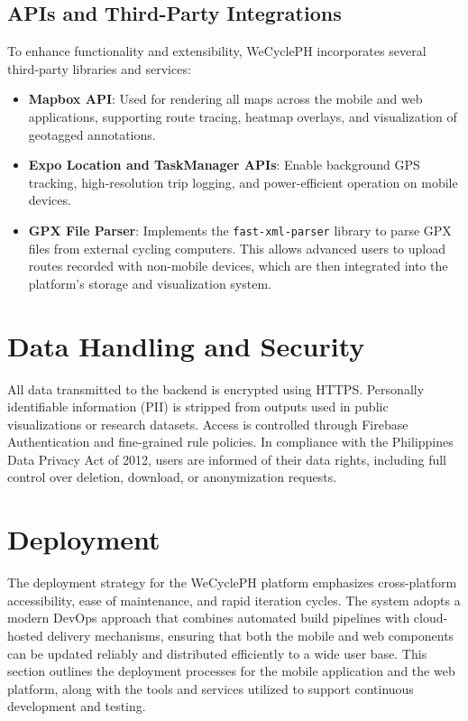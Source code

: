 \subsection{APIs and Third-Party Integrations}
To enhance functionality and extensibility, WeCyclePH incorporates several third-party libraries and services:
\begin{itemize}
\item \textbf{Mapbox API}: Used for rendering all maps across the mobile and web applications, supporting route tracing, heatmap overlays, and visualization of geotagged annotations.
\item \textbf{Expo Location and TaskManager APIs}: Enable background GPS tracking, high-resolution trip logging, and power-efficient operation on mobile devices.
\item \textbf{GPX File Parser}: Implements the \texttt{fast-xml-parser} library to parse GPX files from external cycling computers. This allows advanced users to upload routes recorded with non-mobile devices, which are then integrated into the platform's storage and visualization system.
\end{itemize}



\section{Data Handling and Security}
All data transmitted to the backend is encrypted using HTTPS. Personally identifiable information (PII) is stripped from outputs used in public visualizations or research datasets. Access is controlled through Firebase Authentication and fine-grained rule policies. In compliance with the Philippines Data Privacy Act of 2012, users are informed of their data rights, including full control over deletion, download, or anonymization requests.

\section{Deployment}

The deployment strategy for the WeCyclePH platform emphasizes cross-platform accessibility, ease of maintenance, and rapid iteration cycles. The system adopts a modern DevOps approach that combines automated build pipelines with cloud-hosted delivery mechanisms, ensuring that both the mobile and web components can be updated reliably and distributed efficiently to a wide user base. This section outlines the deployment processes for the mobile application and the web platform, along with the tools and services utilized to support continuous development and testing.

